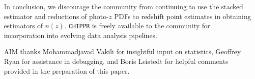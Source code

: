 \documentclass[iop]{emulateapj}
\newcommand{\chippr}{\texttt{CHIPPR} }
\begin{document}
In conclusion, we discourage the community from continuing to use the stacked 
estimator and reductions of photo-$z$ PDFs to redshift point estimates in 
obtaining estimators of $n(z)$.  \chippr is freely available to the community 
for incorporation into evolving data analysis pipelines.  



\begin{acknowledgements}
AIM thanks Mohammadjavad Vakili for insightful input on statistics, Geoffrey 
Ryan for assistance in debugging, and Boris Leistedt for helpful comments 
provided in the preparation of this paper.
\end{acknowledgements}
\end{document}
